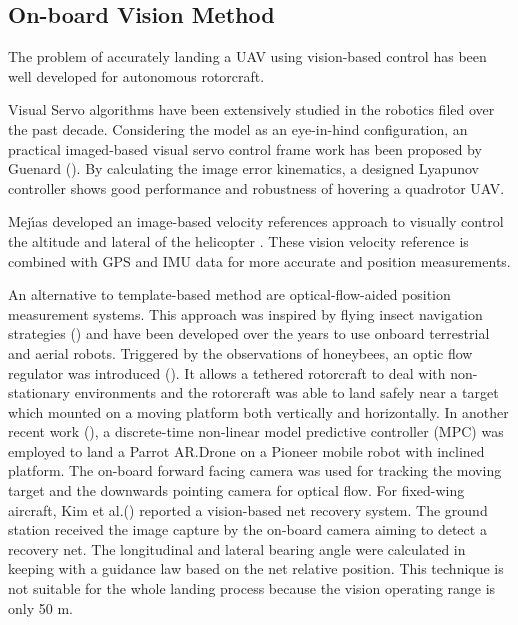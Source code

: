 \subsection{On-board Vision Method}
The problem of accurately landing a UAV using vision-based control has been well developed for autonomous rotorcraft. 

Visual Servo algorithms have been extensively studied in the robotics filed over the past decade. Considering the model as an eye-in-hind configuration, an practical imaged-based visual servo control frame work has been proposed by Guenard (\cite{Guenard2008}). By calculating the image error kinematics, a designed Lyapunov controller shows good performance and robustness of hovering a quadrotor UAV. 

Mej{\'{\i}}as developed an image-based velocity references approach to visually control the altitude and lateral of the helicopter \cite{Mejias2006}. These vision velocity reference is combined with GPS and IMU data for more accurate and position measurements.

An alternative to template-based method are optical-flow-aided position measurement systems. This approach was inspired by flying insect navigation strategies (\cite{Green2004}) and have been developed over the years to use onboard terrestrial and aerial robots. Triggered by the observations of honeybees, an optic flow regulator was introduced (\cite{Ruffier2014}). It allows a tethered rotorcraft to deal with non-stationary environments and the rotorcraft was able to land safely near a target which mounted on a moving platform both vertically and horizontally. In another recent work (\cite{Vlantis2015}), a discrete-time non-linear model predictive controller (MPC) was employed to land a Parrot AR.Drone on a Pioneer mobile robot with inclined platform. The on-board forward facing camera was used for tracking the moving target and the downwards pointing camera for optical flow. For fixed-wing aircraft, Kim et al.(\cite{Kim2013}) reported a vision-based net recovery system. The ground station received the image capture by the on-board camera aiming to detect a recovery net. The longitudinal and lateral bearing angle were calculated in keeping with a guidance law based on the net relative position. This technique is not suitable for the whole landing process because the vision operating range is only 50 m.
 


